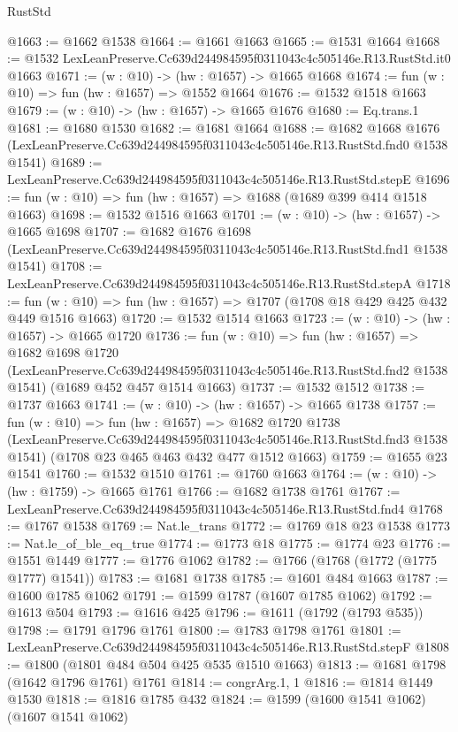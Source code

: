 \begin{lexlean}{RustStd}
\begin{coremodule}
@1663 := @1662 @1538
@1664 := @1661 @1663
@1665 := @1531 @1664
@1668 := @1532 LexLeanPreserve.Cc639d244984595f0311043c4c505146e.R13.RustStd.it0 @1663
@1671 := (w : @10) -> (hw : @1657) -> @1665 @1668
@1674 := fun (w : @10) => fun (hw : @1657) => @1552 @1664
@1676 := @1532 @1518 @1663
@1679 := (w : @10) -> (hw : @1657) -> @1665 @1676
@1680 := Eq.trans.{1}
@1681 := @1680 @1530
@1682 := @1681 @1664
@1688 := @1682
    @1668
    @1676
    (LexLeanPreserve.Cc639d244984595f0311043c4c505146e.R13.RustStd.fnd0 @1538 @1541)
@1689 := LexLeanPreserve.Cc639d244984595f0311043c4c505146e.R13.RustStd.stepE
@1696 := fun (w : @10) => fun (hw : @1657) => @1688 (@1689 @399 @414 @1518 @1663)
@1698 := @1532 @1516 @1663
@1701 := (w : @10) -> (hw : @1657) -> @1665 @1698
@1707 := @1682
    @1676
    @1698
    (LexLeanPreserve.Cc639d244984595f0311043c4c505146e.R13.RustStd.fnd1 @1538 @1541)
@1708 := LexLeanPreserve.Cc639d244984595f0311043c4c505146e.R13.RustStd.stepA
@1718 := fun (w : @10) => fun (hw : @1657) => @1707 (@1708 @18 @429 @425 @432 @449 @1516 @1663)
@1720 := @1532 @1514 @1663
@1723 := (w : @10) -> (hw : @1657) -> @1665 @1720
@1736 := fun (w : @10) =>
  fun (hw : @1657) =>
  @1682
    @1698
    @1720
    (LexLeanPreserve.Cc639d244984595f0311043c4c505146e.R13.RustStd.fnd2 @1538 @1541)
    (@1689 @452 @457 @1514 @1663)
@1737 := @1532 @1512
@1738 := @1737 @1663
@1741 := (w : @10) -> (hw : @1657) -> @1665 @1738
@1757 := fun (w : @10) =>
  fun (hw : @1657) =>
  @1682
    @1720
    @1738
    (LexLeanPreserve.Cc639d244984595f0311043c4c505146e.R13.RustStd.fnd3 @1538 @1541)
    (@1708 @23 @465 @463 @432 @477 @1512 @1663)
@1759 := @1655 @23 @1541
@1760 := @1532 @1510
@1761 := @1760 @1663
@1764 := (w : @10) -> (hw : @1759) -> @1665 @1761
@1766 := @1682 @1738 @1761
@1767 := LexLeanPreserve.Cc639d244984595f0311043c4c505146e.R13.RustStd.fnd4
@1768 := @1767 @1538
@1769 := Nat.le_trans
@1772 := @1769 @18 @23 @1538
@1773 := Nat.le_of_ble_eq_true
@1774 := @1773 @18
@1775 := @1774 @23
@1776 := @1551 @1449
@1777 := @1776 @1062
@1782 := @1766 (@1768 (@1772 (@1775 @1777) @1541))
@1783 := @1681 @1738
@1785 := @1601 @484 @1663
@1787 := @1600 @1785 @1062
@1791 := @1599 @1787 (@1607 @1785 @1062)
@1792 := @1613 @504
@1793 := @1616 @425
@1796 := @1611 (@1792 (@1793 @535))
@1798 := @1791 @1796 @1761
@1800 := @1783 @1798 @1761
@1801 := LexLeanPreserve.Cc639d244984595f0311043c4c505146e.R13.RustStd.stepF
@1808 := @1800 (@1801 @484 @504 @425 @535 @1510 @1663)
@1813 := @1681 @1798 (@1642 @1796 @1761) @1761
@1814 := congrArg.{1, 1}
@1816 := @1814 @1449 @1530
@1818 := @1816 @1785 @432
@1824 := @1599 (@1600 @1541 @1062) (@1607 @1541 @1062)

\end{coremodule}
\end{lexlean}
